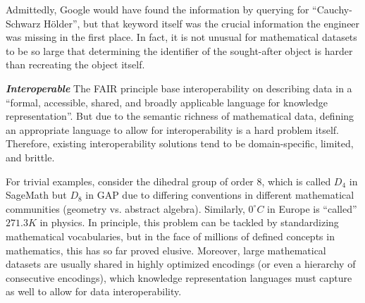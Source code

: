Admittedly, Google would have found the information by querying for ``Cauchy-Schwarz H\"older'', but that keyword itself was the crucial information the engineer was missing in the first place. 
In fact, it is not unusual for mathematical datasets to be so large that determining the identifier of the sought-after object is harder than recreating the object itself.

\medskip

\textbf{\emph{Interoperable}}
The FAIR principle base interoperability on describing data in a ``formal, accessible, shared, and broadly applicable language for knowledge representation''.
But due to the semantic richness of mathematical data, defining an appropriate language to allow for interoperability is a hard problem itself.
Therefore, existing interoperability solutions tend to be domain-specific, limited, and brittle.

For trivial examples, consider the dihedral group of order 8, which is called $D_4$ in SageMath but $D_8$ in GAP due to differing conventions in different mathematical communities (geometry vs. abstract algebra).
Similarly, $0^\circ C$ in Europe is ``called'' $271.3 K$ in physics.
In principle, this problem can be tackled by standardizing mathematical vocabularies, but in the face of millions of defined concepts in mathematics, this has so far proved elusive.
Moreover, large mathematical datasets are usually shared in highly optimized encodings (or even a hierarchy of consecutive encodings), which knowledge representation languages must capture as well to allow for data interoperability.


